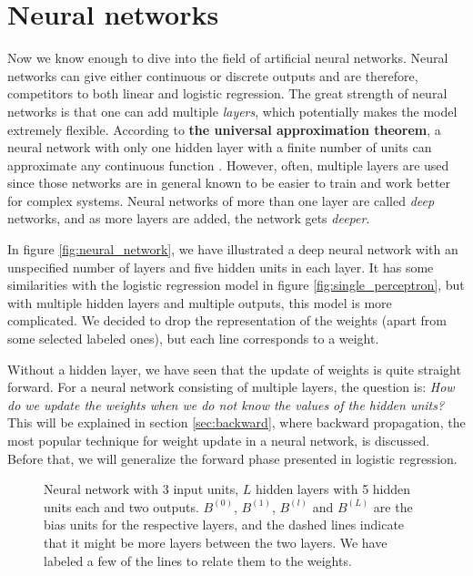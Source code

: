 \section{Neural networks} \label{sec:neural_network}
Now we know enough to dive into the field of artificial neural networks. Neural networks can give either continuous or discrete outputs and are therefore, competitors to both linear and logistic regression. The great strength of neural networks is that one can add multiple \textit{layers}, which potentially makes the model extremely flexible. According to \textbf{the universal approximation theorem}, a neural network with only one hidden layer with a finite number of units can approximate any continuous function \supercite{hornik_multilayer_1989}. However, often, multiple layers are used since those networks are in general known to be easier to train and work better for complex systems. Neural networks of more than one layer are called \textit{deep} networks, and as more layers are added, the network gets \textit{deeper}.

In figure \eqref{fig:neural_network}, we have illustrated a deep neural network with an unspecified number of layers and five hidden units in each layer. It has some similarities with the logistic regression model in figure \eqref{fig:single_perceptron}, but with multiple hidden layers and multiple outputs, this model is more complicated. We decided to drop the representation of the weights (apart from some selected labeled ones), but each line corresponds to a weight.

Without a hidden layer, we have seen that the update of weights is quite straight forward. For a neural network consisting of multiple layers, the question is: \textit{How do we update the weights when we do not know the values of the hidden units?} This will be explained in section \ref{sec:backward}, where backward propagation, the most popular technique for weight update in a neural network, is discussed. Before that, we will generalize the forward phase presented in logistic regression.

\begin{figure}
	\centering
	
	\caption{Neural network with 3 input units, $L$ hidden layers with 5 hidden units each and two outputs. $B^{(0)}$, $B^{(1)}$, $B^{(l)}$ and $B^{(L)}$ are the bias units for the respective layers, and the dashed lines indicate that it might be more layers between the two layers. We have labeled a few of the lines to relate them to the weights.}
	\label{fig:neural_network}
\end{figure}

